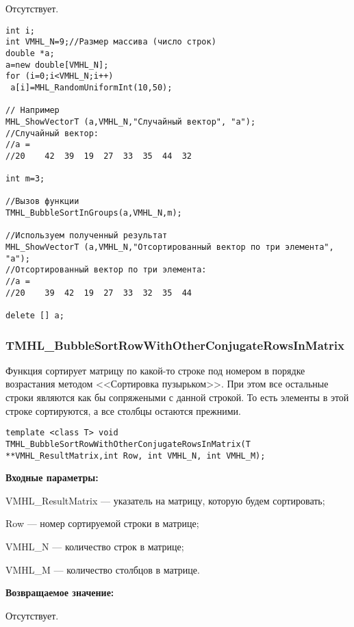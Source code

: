 \documentclass[a4paper,12pt]{article}
\begin{document}
Отсутствует.


\begin{lstlisting}[label=code_use_TMHL_BubbleSortInGroups,caption=Пример использования]
int i;
int VMHL_N=9;//Размер массива (число строк)
double *a;
a=new double[VMHL_N];
for (i=0;i<VMHL_N;i++)
 a[i]=MHL_RandomUniformInt(10,50);

// Например
MHL_ShowVectorT (a,VMHL_N,"Случайный вектор", "a");
//Случайный вектор:
//a =
//20	42	39	19	27	33	35	44	32

int m=3;

//Вызов функции
TMHL_BubbleSortInGroups(a,VMHL_N,m);

//Используем полученный результат
MHL_ShowVectorT (a,VMHL_N,"Отсортированный вектор по три элемента", "a");
//Отсортированный вектор по три элемента:
//a =
//20	39	42	19	27	33	32	35	44

delete [] a;
\end{lstlisting}

\subsubsection{TMHL\_BubbleSortRowWithOtherConjugateRowsInMatrix}\label{TMHL_BubbleSortRowWithOtherConjugateRowsInMatrix}

Функция сортирует матрицу по какой-то строке под номером в порядке возрастания методом <<Сортировка пузырьком>>. При этом все остальные строки являются как бы сопряжеными с данной строкой. То есть элементы в этой строке сортируются, а все столбцы остаются прежними.


\begin{lstlisting}[label=code_syntax_TMHL_BubbleSortRowWithOtherConjugateRowsInMatrix,caption=Синтаксис]
template <class T> void TMHL_BubbleSortRowWithOtherConjugateRowsInMatrix(T **VMHL_ResultMatrix,int Row, int VMHL_N, int VMHL_M);
\end{lstlisting}

\textbf{Входные параметры:}
 
VMHL\_ResultMatrix --- указатель на матрицу, которую будем сортировать;
 
Row --- номер сортируемой строки в матрице;
 
VMHL\_N --- количество строк в матрице;
 
VMHL\_M --- количество столбцов в матрице.

\textbf{Возвращаемое значение:}

Отсутствует.
\end{document}
